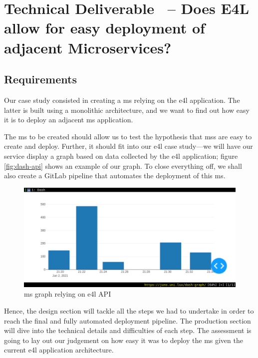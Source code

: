 \section{Technical Deliverable \thetdel\ -- Does E4L allow for easy
deployment of adjacent Microservices?}
\label{td:ms}

\subsection{Requirements}

Our case study consisted in creating a \gls{ms} relying on the
\gls{e4l} application. The latter is built using a monolithic
architecture, and we want to find out how easy it is to deploy an
adjacent \gls{ms} application.

The \gls{ms} to be created should allow us to test the hypothesis that
\glspl{ms} are easy to create and deploy. Further, it should fit into
our \gls{e4l} case study---we will have our service display a graph
based on data collected by the \gls{e4l} application; figure
\vref{fig:dash-api} shows an example of our graph.  To close
everything off, we shall also create a GitLab pipeline that automates
the deployment of this \gls{ms}.

\begin{figure}
	\centering
	\includegraphics[width=\linewidth]{images/dash-API-demo.png}
	\caption{\gls{ms} graph relying on \gls{e4l} API}
	\label{fig:dash-api}
\end{figure}

Hence, the design section will tackle all the steps we had to
undertake in order to reach the final and fully automated deployment
pipeline. The production section will dive into the technical details
and difficulties of each step. The assessment is going to lay out our
judgement on how easy it was to deploy the \gls{ms} given the current
\gls{e4l} application architecture.


